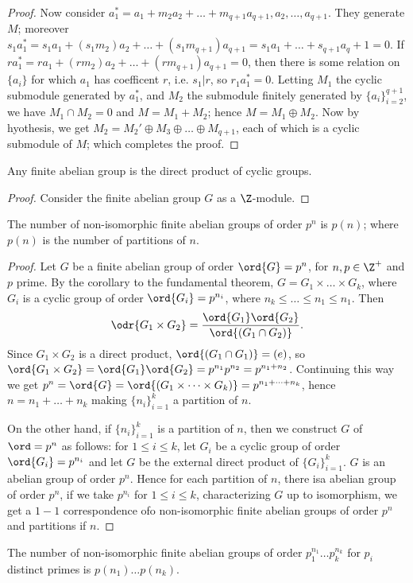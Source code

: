 \begin{proof}
    Now consider $a_1^*=a_1+m_2a_2+\dots+m_{q+1}a_{q+1},a_2, \dots, a_{q+1}$. They generate $M$;
    moreover  $s_1a_1^*=s_1a_1+(s_1m_2)a_2+\dots+(s_1m_{q+1})a_{q+1}=s_1a_1+\dots+s_{q+1}a_q+1=0$.
    If $ra_1^*=ra_1+(rm_2)a_2+\dots+(rm_{q+1})a_{q+1}=0$, then there is some relation on $\{a_i\}$
    for which $a_1$ has coefficent $r$, i.e.  $s_1|r$, so $r_1a_1^*=0$. Letting $M_1$ the cyclic
    submodule generated by $a_1^*$, and $M_2$ the submodule finitely generated by
    $\{a_i\}_{i=2}^{q+1}$, we have $M_1 \cap M_2=0$ and $M=M_1+M_2$; hence $M=M_1 \oplus M_2$. Now
    by hyothesis, we get $M_2=M_2' \oplus M_3 \oplus \dots \oplus M_{q+1}$, each of which is a
    cyclic submodule of $M$; which completes the proof.
\end{proof}
\begin{corollary}
    Any finite abelian group is the direct product of cyclic groups.
\end{corollary}
\begin{proof}
    Consider the finite abelian group $G$ as a  $\Z$-module.
\end{proof}

\begin{theorem} 
    The number of non-isomorphic finite abelian groups of order $p^n$ is  $p(n)$; where $p(n)$ is the
    number of partitions of $n$.
\end{theorem}
\begin{proof}
    Let $G$ be a finite abelian group of order $\ord{G}=p^n$, for $n,p \in \Z^+$ and  $p$ prime. By
    the corollary to the fundamental theorem,  $G=G_1 \times \dots \times G_k$, where $G_i$ is a
    cyclic group of order  $\ord{G_i}=p^{n_i}$, where $n_k \leq \dots \leq n_1 \leq n_1$. Then
        \begin{equation*}
            \odr{G_1 \times G_2}=\frac{\ord{G_1}\ord{G_2}}{\ord{(G_1 \cap G_2)}}.
        \end{equation*}
        Since $G_1 \times G_2$ is a direct product, $\ord{(G_1 \cap G_1)}=(e)$, so $\ord{G_1 \times
        G_2}=\ord{G_1}\ord{G_2}=p^{n_1}p^{n_2}=p^{n_1+n_2}$. Continuing this way we get
        $p^n=\ord{G}=\ord{(G_1 \times \dots \times G_k)}=p^{n_1+\dots+n_k}$, hence $n=n_1+\dots+n_k$
        making $\{n_i\}_{i=1}^k$ a partition of $n$.

        On the other hand, if $\{n_i\}_{i=1}^k$ is a partition of $n$, then we construct  $G$ of
        $\ord=p^n$ as follows: for  $1 \leq i \leq k$, let  $G_i$ be a cyclic group of order
        $\ord{G_i}=p^{n_i}$ and let $G$ be the external direct product of  $\{G_i\}_{i=1}^k$. $G$ is
        an abelian group of order  $p^n$. Hence for each partition of  $n$, there isa abelian group
        of order  $p^n$, if we take  $p^{n_i}$ for $1 \leq i \leq k$, characterizing  $G$ up to
        isomorphism, we get a  $1-1$ correspondence ofo non-isomorphic finite abelian groups of
        order  $p^n$ and partitions if  $n$.
\end{proof}
\begin{corollary}
    The number of non-isomorphic finite abelian groups of order $p_1^{n_1} \dots p_k^{n_k}$ for
    $p_i$ distinct primes is  $p(n_1) \dots p(n_k)$.
\end{corollary}

